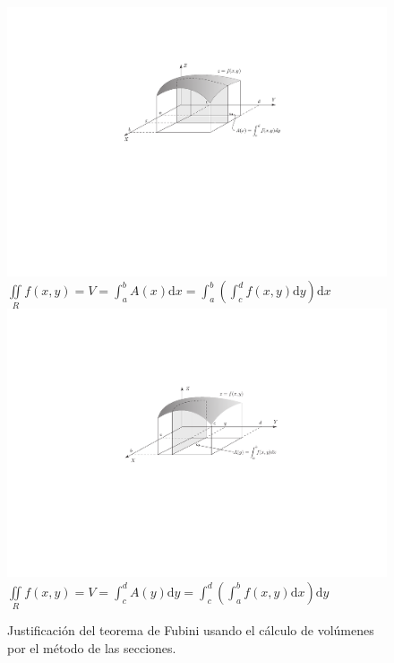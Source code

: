 \begin{latexonly}
\begin{figure}[p]
\begin{center}
\includegraphics[width=.8\textwidth]{T3/figs/FubIntroX.pdf}\\
$\displaystyle\iint\limits_R f(x,y) = V = \int_a^b A(x)\mathrm dx = \int_a^b \left(\int_c^d f(x,y)\mathrm dy\right)\mathrm dx$\\[6em]
\includegraphics[width=.8\textwidth]{T3/figs/FubIntroY.pdf}\\
$\displaystyle\iint\limits_R f(x,y) = V = \int_c^d A(y)\mathrm dy = \int_c^d \left(\int_a^b f(x,y)\mathrm dx\right)\mathrm dy$
\end{center}
\caption{Justificación del teorema de Fubini usando el cálculo de volúmenes por el método de las secciones.}\label{fig:fub-sec}
\end{figure}
\end{latexonly}


